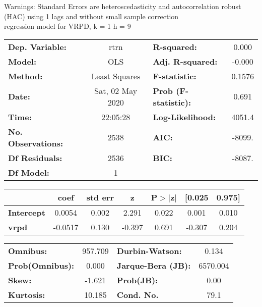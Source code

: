 Warnings: \newline
 [1] Standard Errors are heteroscedasticity and autocorrelation robust (HAC) using 1 lags and without small sample correction\\ 

regression model for VRPD, k = 1 h = 9\begin{center}
\begin{tabular}{lclc}
\toprule
\textbf{Dep. Variable:}    &       rtrn       & \textbf{  R-squared:         } &     0.000   \\
\textbf{Model:}            &       OLS        & \textbf{  Adj. R-squared:    } &    -0.000   \\
\textbf{Method:}           &  Least Squares   & \textbf{  F-statistic:       } &    0.1576   \\
\textbf{Date:}             & Sat, 02 May 2020 & \textbf{  Prob (F-statistic):} &    0.691    \\
\textbf{Time:}             &     22:05:28     & \textbf{  Log-Likelihood:    } &    4051.4   \\
\textbf{No. Observations:} &        2538      & \textbf{  AIC:               } &    -8099.   \\
\textbf{Df Residuals:}     &        2536      & \textbf{  BIC:               } &    -8087.   \\
\textbf{Df Model:}         &           1      & \textbf{                     } &             \\
\bottomrule
\end{tabular}
\begin{tabular}{lcccccc}
                   & \textbf{coef} & \textbf{std err} & \textbf{z} & \textbf{P$> |$z$|$} & \textbf{[0.025} & \textbf{0.975]}  \\
\midrule
\textbf{Intercept} &       0.0054  &        0.002     &     2.291  &         0.022        &        0.001    &        0.010     \\
\textbf{vrpd}      &      -0.0517  &        0.130     &    -0.397  &         0.691        &       -0.307    &        0.204     \\
\bottomrule
\end{tabular}
\begin{tabular}{lclc}
\textbf{Omnibus:}       & 957.709 & \textbf{  Durbin-Watson:     } &    0.134  \\
\textbf{Prob(Omnibus):} &   0.000 & \textbf{  Jarque-Bera (JB):  } & 6570.004  \\
\textbf{Skew:}          &  -1.621 & \textbf{  Prob(JB):          } &     0.00  \\
\textbf{Kurtosis:}      &  10.185 & \textbf{  Cond. No.          } &     79.1  \\
\bottomrule
\end{tabular}
\end{center}


